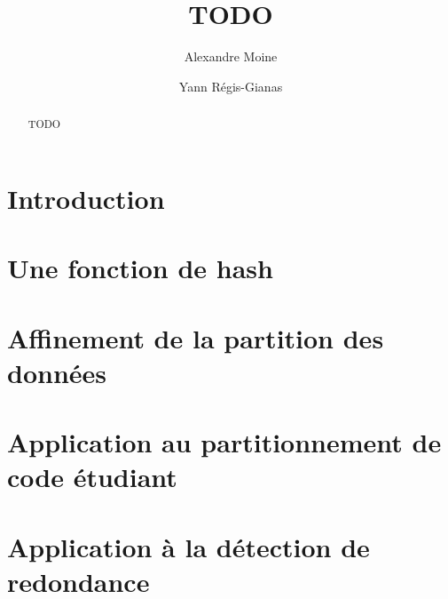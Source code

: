 \documentclass[a4paper]{easychair}
\title{TODO}
\author{Alexandre Moine \and Yann Régis-Gianas}
\institute{Université Paris-Diderot}
\begin{document}
\maketitle

\begin{abstract}
TODO
\end{abstract}

\section{Introduction}


\section{Une fonction de hash}
\label{sec:hash}


\section{Affinement de la partition des données}


\section{Application au partitionnement de code étudiant}
\label{sec:partition}


\section{Application à la détection de redondance}
\label{sec:redundancy}



\end{document}

